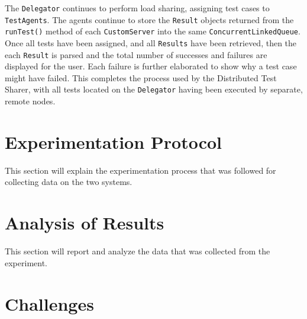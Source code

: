 \documentclass{article}
\begin{document}
{The \texttt{Delegator} continues to perform load sharing, assigning test cases to \texttt{TestAgents}.  The agents continue to store the \texttt{Result} objects returned from the \texttt{runTest()} method of each \texttt{CustomServer} into the same \texttt{ConcurrentLinkedQueue}.  Once all tests have been assigned, and all \texttt{Results} have been retrieved, then the each \texttt{Result} is parsed and the total number of successes and failures are displayed for the user.  Each failure is further elaborated to show why a test case might have failed.  This completes the process used by the Distributed Test Sharer, with all tests located on the \texttt{Delegator} having been executed by separate, remote nodes.

\section{Experimentation Protocol}

This section will explain the experimentation process that was followed for collecting data on the two systems.


\section{Analysis of Results}

This section will report and analyze the data that was collected from the experiment.

\section{Challenges}

}
\end{document}
